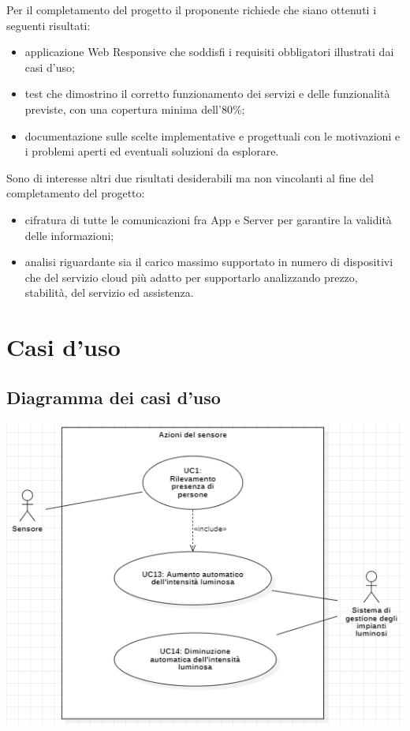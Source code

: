 \documentclass[a4paper, 12pt]{article}
\begin{document}
Per il completamento del progetto il proponente richiede che siano ottenuti i
seguenti risultati:
\begin{itemize}
    \item applicazione Web Responsive che soddisfi i requisiti obbligatori
          illustrati dai casi d'uso;
    \item test che dimostrino il corretto funzionamento dei servizi e delle
          funzionalità previste, con una copertura minima dell'80\%;
    \item documentazione sulle scelte implementative e progettuali con le
          motivazioni e i problemi aperti ed eventuali soluzioni da esplorare.
\end{itemize}
Sono di interesse altri due risultati desiderabili ma non vincolanti al fine del
completamento del progetto:
\begin{itemize}
    \item cifratura di tutte le comunicazioni fra App e Server per garantire la
          validità delle informazioni;
    \item analisi riguardante sia il carico massimo supportato in numero di
          dispositivi che del servizio cloud più adatto per supportarlo
          analizzando prezzo, stabilità, del servizio ed assistenza.
\end{itemize}
\newpage
\section{Casi d'uso}

\subsection{Diagramma dei casi d'uso}

\includegraphics[scale=0.8]{diagramma_use_case_1.png}
\end{document}

